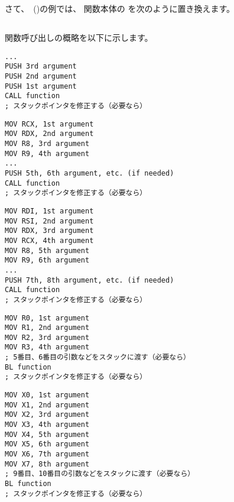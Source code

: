 \section{\PrintfSeveralArgumentsSectionName}

さて、\IT{\HelloWorldSectionName}~()の例では、 
\main 関数本体の \printf を次のように置き換えます。







\subsection{\Conclusion{}}

関数呼び出しの概略を以下に示します。

\begin{lstlisting}[caption=x86,style=customasmx86]
...
PUSH 3rd argument
PUSH 2nd argument
PUSH 1st argument
CALL function
; スタックポインタを修正する（必要なら）
\end{lstlisting}

\begin{lstlisting}[caption=x64 (MSVC),style=customasmx86]
MOV RCX, 1st argument
MOV RDX, 2nd argument
MOV R8, 3rd argument
MOV R9, 4th argument
...
PUSH 5th, 6th argument, etc. (if needed)
CALL function
; スタックポインタを修正する（必要なら）
\end{lstlisting}

\begin{lstlisting}[caption=x64 (GCC),style=customasmx86]
MOV RDI, 1st argument
MOV RSI, 2nd argument
MOV RDX, 3rd argument
MOV RCX, 4th argument
MOV R8, 5th argument
MOV R9, 6th argument
...
PUSH 7th, 8th argument, etc. (if needed)
CALL function
; スタックポインタを修正する（必要なら）
\end{lstlisting}

\begin{lstlisting}[caption=ARM,style=customasmARM]
MOV R0, 1st argument
MOV R1, 2nd argument
MOV R2, 3rd argument
MOV R3, 4th argument
; 5番目、6番目の引数などをスタックに渡す（必要なら）
BL function
; スタックポインタを修正する（必要なら）
\end{lstlisting}

\begin{lstlisting}[caption=ARM64,style=customasmARM]
MOV X0, 1st argument
MOV X1, 2nd argument
MOV X2, 3rd argument
MOV X3, 4th argument
MOV X4, 5th argument
MOV X5, 6th argument
MOV X6, 7th argument
MOV X7, 8th argument
; 9番目、10番目の引数などをスタックに渡す（必要なら）
BL function
; スタックポインタを修正する（必要なら）
\end{lstlisting}


